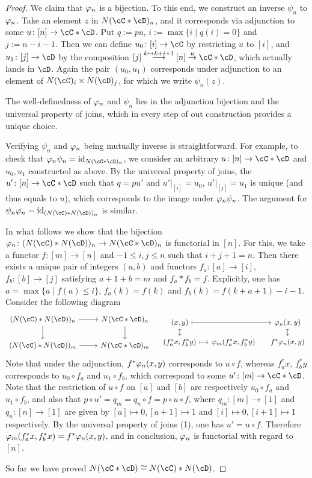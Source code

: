 \documentclass[a4paper,11pt,openany]{scrartcl}
\begin{document}
\begin{proof}
We claim that $\varphi_n$ is a bijection. To this end, we construct an inverse $\psi_n$ to $\varphi_n$. Take an element $z$ in $N(\cC*\cD)_n$, and it corresponds via adjunction to some $u\colon[n]\to\cC*\cD$. Put $q:=pu$, $i:=\max\{i\mid q(i)=0\}$ and $j:=n-i-1$. Then we can define $u_0\colon[i]\to \cC$ by restricting $u$ to $[i]$, and $u_1\colon[j]\to\cD$ by the composition $[j]\overset{k\mapsto k+i+1}{\longrightarrow}[n]\overset{u}{\to}\cC*\cD$, which actually lands in $\cD$. Again the pair $(u_0,u_1)$ corresponds under adjunction to an element of $N(\cC)_i\times N(\cD)_j$, for which we write $\psi_n(z)$. 

The well-definedness of $\varphi_n$ and $\psi_n$ lies in the adjunction bijection and the universal property of joins, which in every step of out construction provides a unique choice. 

Verifying $\psi_n$ and $\varphi_n$ being mutually inverse is straightforward. For example, to check that $\f_n\psi_n=\id_{N(\cC*\cD)_n}$, we consider an arbitrary $u\colon[n]\to\cC*\cD$ and $u_0,u_1$ constructed as above. By the universal property of joins, the $u'\colon[n]\to\cC*\cD$ such that $q=pu'$ and $u'|_{[i]}=u_0$, $u'|_{[j]}=u_1$ is unique (and thus equals to $u$), which corresponds to the image under $\varphi_n\psi_n$. The argument for $\psi_n\f_n=\id_{(N(\cC)*N(\cD))_n}$ is similar.

In what follows we show that the bijection $\f_n\colon (N(\cC)*N(\cD))_n\to N(\cC*\cD)_n$ is functorial in $[n]$. For this, we take a functor $f\colon[m]\to[n]$ and $-1\leqslant i,j\leqslant n$ such that $i+j+1=n$. Then there exists a unique pair of integers $(a,b)$  and functors $f_a\colon[a]\to[i]$, $f_b\colon[b]\to[j]$ satisfying $a+1+b=m$ and $f_a*f_b=f$. Explicitly, one has $a=\max\{a\mid f(a)\leqslant i\}$, $f_a(k)=f(k)$ and $f_b(k)=f(k+a+1)-i-1$. Consider the following diagram
\[
\begin{tikzcd}
(N(\cC)*N(\cD))_n\arrow[r]\arrow[d]& N(\cC*\cD)_n\arrow[d]\\
(N(\cC)*N(\cD))_m\arrow[r]& N(\cC*\cD)_m
\end{tikzcd}
\quad
\begin{tikzcd}[sep=small]
(x,y)\arrow[rr,mapsto]\arrow[d,mapsto]&& \f_n(x,y)\arrow[d,mapsto]\\
(f^*_ax,f^*_by)\arrow[r,mapsto]& \f_m(f^*_ax,f^*_by)& f^*\f_n(x,y)
\end{tikzcd}
\]
Note that under the adjunction, $f^*\varphi_n(x,y)$ corresponds to $u\circ f$, whereas $f^*_ax$, $f^*_by$ corresponds to $u_0\circ f_a$ and $u_1\circ f_b$, which correspond to some $u'\colon[m]\to\cC*\cD$. Note that the restriction of $u\circ f$ on $[a]$ and $[b]$ are respectively $u_0\circ f_a$ and $u_1\circ f_b$, and also that $p\circ u'=q_m=q_n\circ f=p\circ u\circ f$, where $q_m\colon[m]\to[1]$ and $q_n\colon[n]\to[1]$ are given by $[a]\mapsto0,[a+1]\mapsto1$ and $[i]\mapsto0,[i+1]\mapsto1$ respectively. By the universal property of joins (1), one has $u'=u\circ f$. Therefore $\varphi_m(f^*_ax,f^*_bx)=f^*\varphi_n(x,y)$, and in conclusion, $\varphi_n$ is functorial with regard to $[n]$.

So far we have proved $N(\cC*\cD)\cong N(\cC)* N(\cD)$.
\end{proof}
\end{document}
